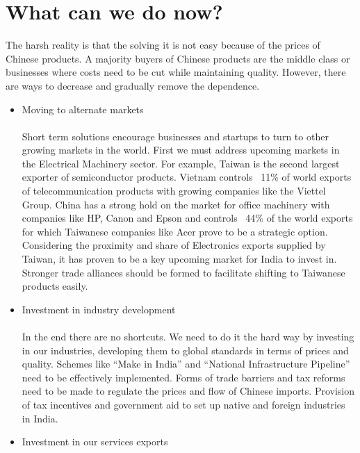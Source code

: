 \documentclass{article}
\begin{document}
\section*{What can we do now?}
The harsh reality is that the solving it is not easy because of the prices of Chinese products. A majority buyers of Chinese products are the middle class or businesses where costs need to be cut while maintaining quality. However, there are ways to decrease and gradually remove the dependence.
\bigskip
\begin{itemize}[nosep , left=0pt , topsep=0pt]
        \item Moving to alternate markets 
            \paragraph{}
            Short term solutions encourage businesses and startups to turn to other growing markets in the world. First we must address upcoming markets in the Electrical Machinery sector. 
            For example, Taiwan is the second largest exporter of semiconductor products. Vietnam controls ~11\% of world exports of telecommunication products with growing companies like the Viettel Group. China has a strong hold on the market for office machinery with companies like HP, Canon and Epson and controls ~44\% of the world exports for which Taiwanese companies like Acer prove to be a strategic option.
            Considering the proximity and share of Electronics exports supplied by Taiwan, it has proven to be a key upcoming market for India to invest in. Stronger trade alliances should be formed to facilitate shifting to Taiwanese products easily.
\bigskip
        \item Investment in industry development
            \paragraph{}
            In the end there are no shortcuts. We need to do it the hard way by investing in our industries, developing them to global standards in terms of prices and quality. 
            Schemes like “Make in India” and “National Infrastructure Pipeline” need to be effectively implemented. 
            Forms of trade barriers and tax reforms need to be made to regulate the prices and flow of Chinese imports. Provision of tax incentives and government aid to set up native and foreign industries in India.
\bigskip
        \item Investment in our services exports

\end{itemize}
\end{document}
